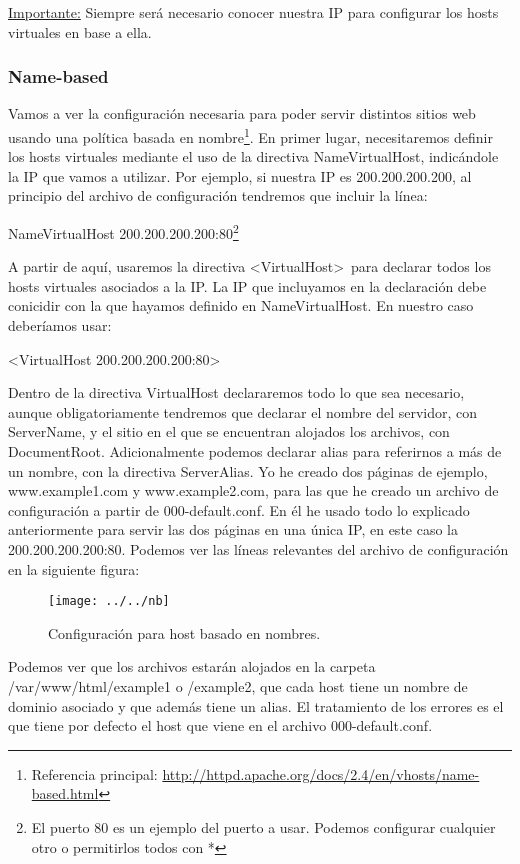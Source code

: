 \documentclass[a4paper, 10pt]{article} %
\begin{document}
\underline{Importante:} Siempre será necesario conocer nuestra IP para configurar los hosts virtuales en base a ella. 

\subsubsection{Name-based}

Vamos a ver la configuración necesaria para poder servir distintos sitios web usando una política basada en nombre\footnote{Referencia principal: \url{http://httpd.apache.org/docs/2.4/en/vhosts/name-based.html}}. En primer lugar, necesitaremos definir los hosts virtuales mediante el uso de la directiva NameVirtualHost, indicándole la IP que vamos a utilizar. Por ejemplo, si nuestra IP es 200.200.200.200, al principio del archivo de configuración tendremos que incluir la línea:

NameVirtualHost 200.200.200.200:80\footnote{El puerto 80 es un ejemplo del puerto a usar. Podemos configurar cualquier otro o permitirlos todos con *}

A partir de aquí, usaremos la directiva <VirtualHost>\ para declarar todos los hosts virtuales asociados a la IP. La IP que incluyamos en la declaración debe conicidir con la que hayamos definido en NameVirtualHost. En nuestro caso deberíamos usar:

<VirtualHost 200.200.200.200:80>

Dentro de la directiva VirtualHost declararemos todo lo que sea necesario, aunque obligatoriamente tendremos que declarar el nombre del servidor, con ServerName, y el sitio en el que se encuentran alojados los archivos, con DocumentRoot. Adicionalmente podemos declarar alias para referirnos a más de un nombre, con la directiva ServerAlias. Yo he creado dos páginas de ejemplo, www.example1.com y www.example2.com, para las que he creado un archivo de configuración a partir de 000-default.conf. En él he usado todo lo explicado anteriormente para servir las dos páginas en una única IP, en este caso la 200.200.200.200:80. Podemos ver las líneas relevantes del archivo de configuración en la siguiente figura: 


\begin{figure}[htpb]
\centering
\texttt{[image: ../../nb]}
\caption{Configuración para host basado en nombres.}
\end{figure}

Podemos ver que los archivos estarán alojados en la carpeta /var/www/html/example1 o /example2, que cada host tiene un nombre de dominio asociado y que además tiene un alias. El tratamiento de los errores es el que tiene por defecto el host que viene en el archivo 000-default.conf.
\end{document}
